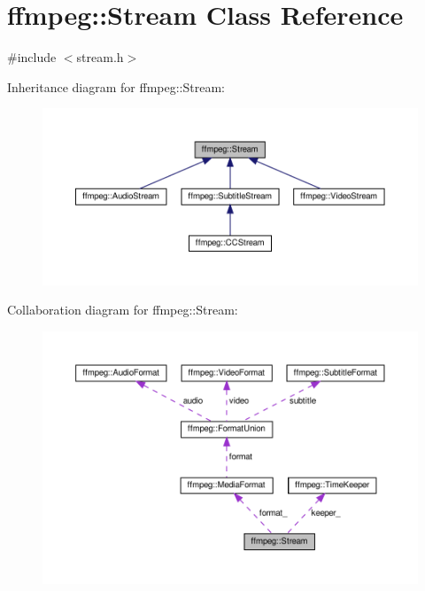 \hypertarget{classffmpeg_1_1Stream}{}\section{ffmpeg\+:\+:Stream Class Reference}
\label{classffmpeg_1_1Stream}


{\ttfamily \#include $<$stream.\+h$>$}



Inheritance diagram for ffmpeg\+:\+:Stream\+:
\nopagebreak
\begin{figure}[H]
\begin{center}
\leavevmode
\includegraphics[width=350pt]{classffmpeg_1_1Stream__inherit__graph}
\end{center}
\end{figure}


Collaboration diagram for ffmpeg\+:\+:Stream\+:
\nopagebreak
\begin{figure}[H]
\begin{center}
\leavevmode
\includegraphics[width=350pt]{classffmpeg_1_1Stream__coll__graph}
\end{center}
\end{figure}
